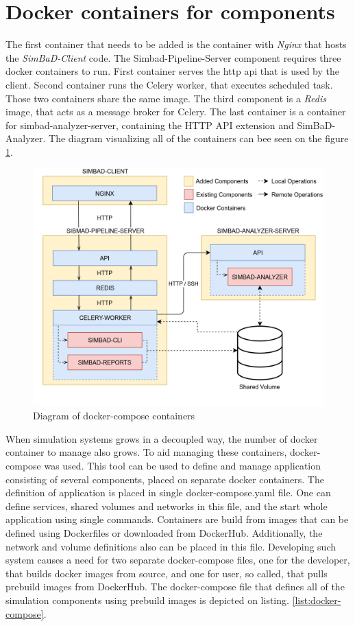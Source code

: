 \section{Docker containers for components}
The first container that needs to be added is the container with \textit{Nginx} that hosts the \textit{SimBaD-Client} code. The Simbad-Pipeline-Server component requires three docker containers to run. First container serves the http api that is used by the client. Second container runs the Celery worker, that executes scheduled task. Those two containers share the same image. The third component is a \textit{Redis} image, that acts as a message broker for Celery. The last container is a container for simbad-analyzer-server, containing the HTTP API extension and SimBaD-Analyzer. The diagram visualizing all of the containers can bee seen on the figure \ref{fig:docker-containers}.
\begin{figure}[h!]
	\centering
		\includegraphics[width=0.9\linewidth]{diagrams/docker.png}
	\caption{Diagram of docker-compose containers}
	\label{fig:docker-containers}
\end{figure}
When simulation systems grows in a decoupled way, the number of docker container to manage also grows. To aid managing these containers, docker-compose was used. This tool can be used to define and manage application consisting of several components, placed on separate docker containers. The definition of application is placed in single docker-compose.yaml file. One can define services, shared volumes and networks in this file, and the start whole application using single commands. Containers are build from images that can be defined using Dockerfiles or downloaded from DockerHub. Additionally, the network and volume definitions also can be placed in this file. Developing such system causes a need for two separate docker-compose files, one for the developer, that builds docker images from source, and one for user, so called, that pulls prebuild images from DockerHub. The docker-compose file that defines all of the simulation components using prebuild images is depicted on listing.  \ref{list:docker-compose}. 
